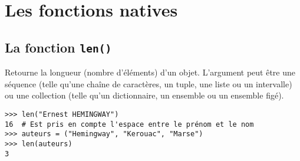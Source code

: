 
\chapter{Les fonctions natives}

\section{La fonction \texttt{len()}}
Retourne la longueur (nombre d'éléments) d'un objet. L'argument peut être une séquence (telle qu'une chaîne de caractères, un tuple, une liste ou un intervalle) ou une collection (telle qu'un dictionnaire, un ensemble ou un ensemble figé).
\begin{verbatim}
>>> len("Ernest HEMINGWAY")
16  # Est pris en compte l'espace entre le prénom et le nom
>>> auteurs = ("Hemingway", "Kerouac", "Marse")
>>> len(auteurs)
3
\end{verbatim}
